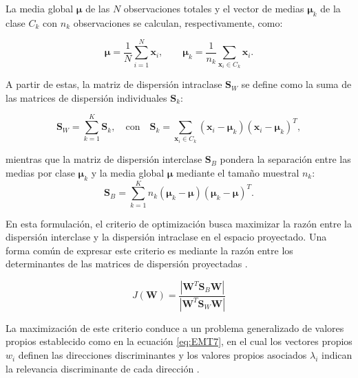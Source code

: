 La media global $\boldsymbol{\mu}$ de las $N$ observaciones totales y el vector de medias $\boldsymbol{\mu}_k$ de la clase $C_k$ con $n_k$ observaciones se calculan, respectivamente, como:

\begin{equation}
	\boldsymbol{\mu} = \frac{1}{N} \sum_{i=1}^N \mathbf{x}_i, \qquad \boldsymbol{\mu}_k = \frac{1}{n_k} \sum_{\mathbf{x}_i \in C_k} \mathbf{x}_i.
	\label{eq:means_multiclass}
\end{equation}

A partir de estas, la matriz de dispersión intraclase $\mathbf{S}_W$ se define como la suma de las matrices de dispersión individuales $\mathbf{S}_k$:

\begin{equation}
	\mathbf{S}_W = \sum_{k=1}^K \mathbf{S}_k, \quad \text{con} \quad \mathbf{S}_k = \sum_{\mathbf{x}_i \in C_k} (\mathbf{x}_i - \boldsymbol{\mu}_k)(\mathbf{x}_i - \boldsymbol{\mu}_k)^T,
	\label{eq:SW_multiclass}
\end{equation}

mientras que la matriz de dispersión interclase $\mathbf{S}_B$ pondera la separación entre las medias por clase $\boldsymbol{\mu}_k$ y la media global $\boldsymbol{\mu}$ mediante el tamaño muestral $n_k$:
\begin{equation}
	\mathbf{S}_B = \sum_{k=1}^K n_k (\boldsymbol{\mu}_k - \boldsymbol{\mu})(\boldsymbol{\mu}_k - \boldsymbol{\mu})^T.
	\label{eq:SB_multiclass}
\end{equation}


En esta formulación, el criterio de optimización busca maximizar la razón entre la dispersión interclase y la dispersión intraclase en el espacio proyectado. Una forma común de expresar este criterio es mediante la razón entre los determinantes de las matrices de dispersión proyectadas \cite{fukunaga2013introduction}.

\begin{equation}
	J(\mathbf{W}) = \frac{|\mathbf{W}^T \mathbf{S}_B \mathbf{W}|}{|\mathbf{W}^T \mathbf{S}_W \mathbf{W}|}
	\label{eq:EMT6}
\end{equation}

La maximización de este criterio conduce a un problema generalizado de valores propios establecido como en la ecuación \ref{eq:EMT7}, en el cual los vectores propios $w_i$ definen las direcciones discriminantes y los valores propios asociados $\lambda_i$ indican la relevancia discriminante de cada dirección \cite{martinez2001pca}.

